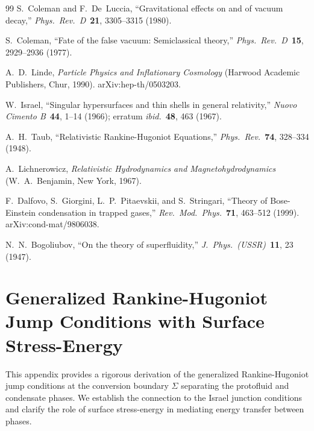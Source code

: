 \documentclass[11pt,a4paper]{article}
\theoremstyle{definition}
\begin{document}
\begin{thebibliography}{99}
S.~Coleman and F.~De~Luccia, ``Gravitational effects on and of vacuum decay,'' \emph{Phys.\ Rev.\ D}\ \textbf{21}, 3305--3315 (1980).

S.~Coleman, ``Fate of the false vacuum: Semiclassical theory,'' \emph{Phys.\ Rev.\ D}\ \textbf{15}, 2929--2936 (1977).

A.~D.~Linde, \emph{Particle Physics and Inflationary Cosmology} (Harwood Academic Publishers, Chur, 1990). arXiv:hep-th/0503203.

W.~Israel, ``Singular hypersurfaces and thin shells in general relativity,'' \emph{Nuovo Cimento B}\ \textbf{44}, 1--14 (1966); erratum \emph{ibid.}\ \textbf{48}, 463 (1967).

A.~H.~Taub, ``Relativistic Rankine-Hugoniot Equations,'' \emph{Phys.\ Rev.}\ \textbf{74}, 328--334 (1948).

A.~Lichnerowicz, \emph{Relativistic Hydrodynamics and Magnetohydrodynamics} (W.~A.~Benjamin, New York, 1967).

F.~Dalfovo, S.~Giorgini, L.~P.~Pitaevskii, and S.~Stringari, ``Theory of Bose-Einstein condensation in trapped gases,'' \emph{Rev.\ Mod.\ Phys.}\ \textbf{71}, 463--512 (1999). arXiv:cond-mat/9806038.

N.~N.~Bogoliubov, ``On the theory of superfluidity,'' \emph{J.\ Phys.\ (USSR)}\ \textbf{11}, 23 (1947).

\end{thebibliography}

\newpage
\appendix




\section{Generalized Rankine-Hugoniot Jump Conditions with Surface Stress-Energy}
\label{app:RH_derivation}

This appendix provides a rigorous derivation of the generalized Rankine-Hugoniot jump conditions at the conversion boundary $\Sigma$ separating the protofluid and condensate phases. We establish the connection to the Israel junction conditions and clarify the role of surface stress-energy in mediating energy transfer between phases.
\end{document}
